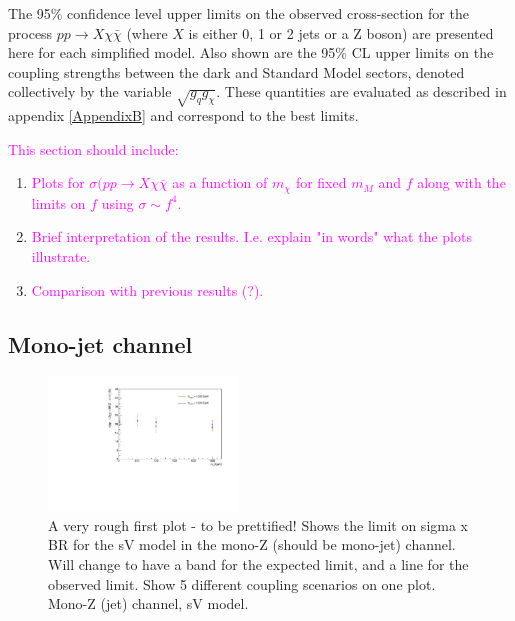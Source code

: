 The 95\% confidence level upper limits on the observed cross-section for the process $pp \rightarrow X\chi\bar{\chi}$ (where $X$ is either 0, 1 or 2 jets or a Z boson) are presented here for each simplified model. Also shown are the 95\% CL upper limits on the coupling strengths between the dark and Standard Model sectors, denoted collectively by the variable $\sqrt{g_{q}g_{\chi}}$. These quantities are evaluated as described in appendix \ref{AppendixB} and correspond to the best limits.

\textcolor{magenta}{This section should include:}
\begin{enumerate}
\item \textcolor{magenta}{Plots for $\sigma(pp \rightarrow X \chi \bar{\chi}$ as a function of $m_{\chi}$ for fixed $m_{M}$ and $f$ along with the limits on $f$ using $\sigma \sim f^{4}$.}
\item \textcolor{magenta}{Brief interpretation of the results. I.e. explain "in words" what the plots illustrate.}
\item \textcolor{magenta}{Comparison with previous results (?).}
\end{enumerate}

\subsection{Mono-jet channel}

\begin{figure}[!h]
\begin{center}
\includegraphics[width=0.45\textwidth]{figures/monoZ_sigma_limits_variedDMmass.pdf}
\caption{A very rough first plot - to be prettified! Shows the limit on sigma x BR for the sV model in the mono-Z (should be mono-jet) channel. Will change to have a band for the expected limit, and a line for the observed limit. Show 5 different coupling scenarios on one plot. Mono-Z (jet) channel, sV model.}
\label{fig:MonoZ_SVD_limit}
\end{center}
\end{figure}

